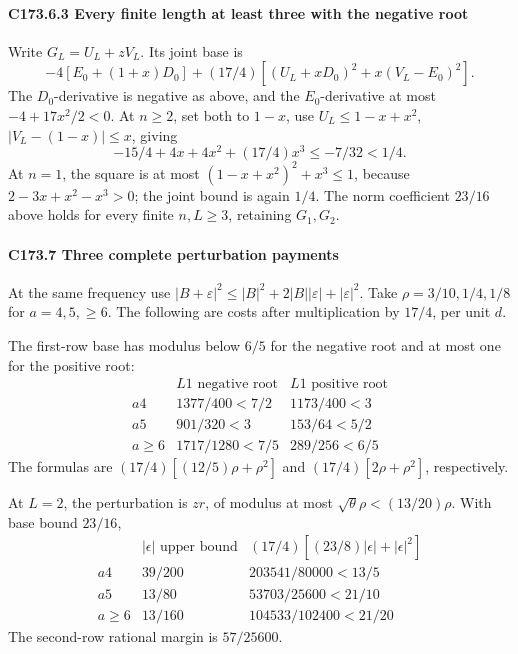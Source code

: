\paragraph{C173.6.3 Every finite length at least three with the negative root}

Write \(G_L=U_L+zV_L.\) Its joint base is
\[
-4[E_0+(1+x)D_0]
+(17/4)[(U_L+xD_0)^2+x(V_L-E_0)^2].
\]
The \(D_0\)-derivative is negative as above, and the \(E_0\)-derivative at most \(-4+17x^2/2<0\). At \(n\ge2\), set both to \(1-x\), use \(U_L\le1-x+x^2\), \(|V_L-(1-x)|\le x\), giving
\[
-15/4+4x+4x^2+(17/4)x^3\le-7/32<1/4.
\]
At \(n=1\), the square is at most \((1-x+x^2)^2+x^3\le1\), because \(2-3x+x^2-x^3>0\); the joint bound is again \(1/4\). The norm coefficient \(23/16\) above holds for every finite \(n,\allowbreak \allowbreak  L\ge3\), retaining \(G_1,\allowbreak \allowbreak  G_2\).

\paragraph{C173.7 Three complete perturbation payments}

At the same frequency use \(|B+\varepsilon|^2\le|B|^2+2|B||\varepsilon|+|\varepsilon|^2\). Take \(\rho=3/10,\allowbreak \allowbreak  1/4,\allowbreak \allowbreak  1/8\) for \(a=4,\allowbreak \allowbreak  5,\allowbreak \allowbreak  \ge6\). The following are costs after multiplication by \(17/4\), per unit \(d\).

The first-row base has modulus below \(6/5\) for the negative root and at most one for the positive root:
\[
\begin{array}{c|cc}
&L1\text{ negative root}&L1\text{ positive root}\\ \hline
a4&1377/400<7/2&1173/400<3\\
a5&901/320<3&153/64<5/2\\
a\ge6&1717/1280<7/5&289/256<6/5
\end{array}                                        \tag{C173.T183.30}
\]
The formulas are \((17/4)[(12/5)\rho+\rho^2]\) and \((17/4)[2\rho+\rho^2]\), respectively.

At \(L=2\), the perturbation is \(zr\), of modulus at most \(\sqrt\theta\rho<(13/20)\rho\). With base bound \(23/16\),
\[
\begin{array}{c|cc}
&|\epsilon|\text{ upper bound}&(17/4)[(23/8)|\epsilon|+|\epsilon|^2]\\ \hline
a4&39/200&203541/80000<13/5\\
a5&13/80&53703/25600<21/10\\
a\ge6&13/160&104533/102400<21/20
\end{array}                                        \tag{C173.T183.31}
\]
The second-row rational margin is \(57/25600\).

